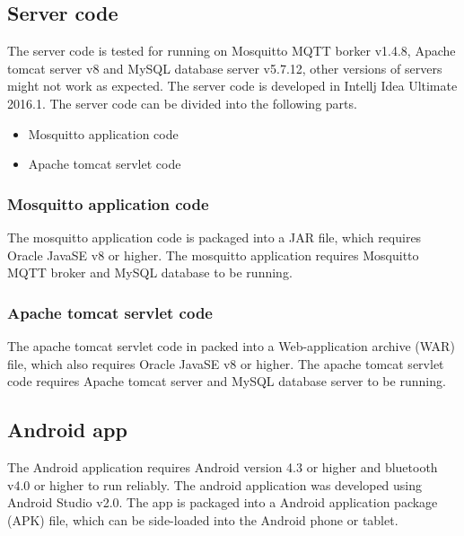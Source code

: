 \subsection{Server code}
The server code is tested for running on Mosquitto MQTT borker v1.4.8, Apache tomcat server v8 and MySQL database  server v5.7.12, other versions of servers might not work as expected. The server code is developed in Intellj Idea Ultimate 2016.1.  The server code can be divided into the following parts.
\begin{itemize}
\item Mosquitto application code
\item Apache tomcat servlet code
\end{itemize}
\subsubsection{Mosquitto application code}
The mosquitto application code is packaged into a JAR file, which requires Oracle JavaSE v8 or higher. The mosquitto application requires Mosquitto MQTT broker and MySQL database to be running.
\subsubsection{Apache tomcat servlet code}
The apache tomcat servlet code in packed into a Web-application archive (WAR) file, which also requires Oracle JavaSE v8 or higher. The apache tomcat servlet code requires Apache tomcat server and MySQL database server to be running.

\subsection{Android app}
The Android application requires Android version 4.3 or higher and bluetooth v4.0  or higher to run reliably. The android application was developed using Android Studio v2.0. The app is packaged into a Android application package (APK) file, which can be side-loaded into the Android phone or tablet.



